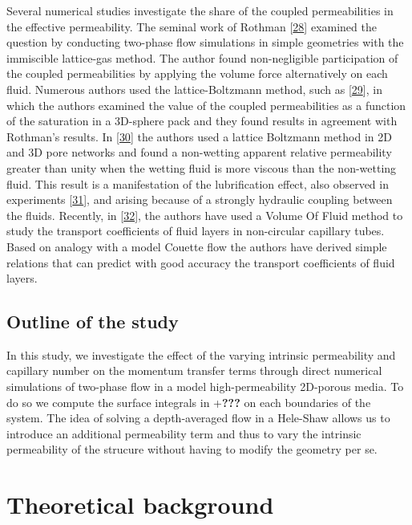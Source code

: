 \documentclass[]{article}
\begin{document}
Several numerical studies investigate the share of the coupled
permeabilities in the effective permeability. The seminal work of
Rothman {[}\protect\hyperlink{ref-Rothman1990}{28}{]} examined the
question by conducting two-phase flow simulations in simple geometries
with the immiscible lattice-gas method. The author found non-negligible
participation of the coupled permeabilities by applying the volume force
alternatively on each fluid. Numerous authors used the lattice-Boltzmann
method, such as {[}\protect\hyperlink{ref-Li2005}{29}{]}, in which the
authors examined the value of the coupled permeabilities as a function
of the saturation in a 3D-sphere pack and they found results in
agreement with Rothman's results. In
{[}\protect\hyperlink{ref-Yiotis2007}{30}{]} the authors used a lattice
Boltzmann method in 2D and 3D pore networks and found a non-wetting
apparent relative permeability greater than unity when the wetting fluid
is more viscous than the non-wetting fluid. This result is a
manifestation of the lubrification effect, also observed in experiments
{[}\protect\hyperlink{ref-odeh1959effect}{31}{]}, and arising because of
a strongly hydraulic coupling between the fluids. Recently, in
{[}\protect\hyperlink{ref-shams2018study}{32}{]}, the authors have used
a Volume Of Fluid method to study the transport coefficients of fluid
layers in non-circular capillary tubes. Based on analogy with a model
Couette flow the authors have derived simple relations that can predict
with good accuracy the transport coefficients of fluid layers.

\hypertarget{outline-of-the-study}{%
\subsection{Outline of the study}\label{outline-of-the-study}}

In this study, we investigate the effect of the varying intrinsic
permeability and capillary number on the momentum transfer terms through
direct numerical simulations of two-phase flow in a model
high-permeability 2D-porous media. To do so we compute the surface
integrals in +\textbf{???} on each boundaries of the system. The idea of
solving a depth-averaged flow in a Hele-Shaw allows us to introduce an
additional permeability term and thus to vary the intrinsic permeability
of the strucure without having to modify the geometry per se.

\hypertarget{theoretical-background}{%
\section{Theoretical background}\label{theoretical-background}}
\end{document}
